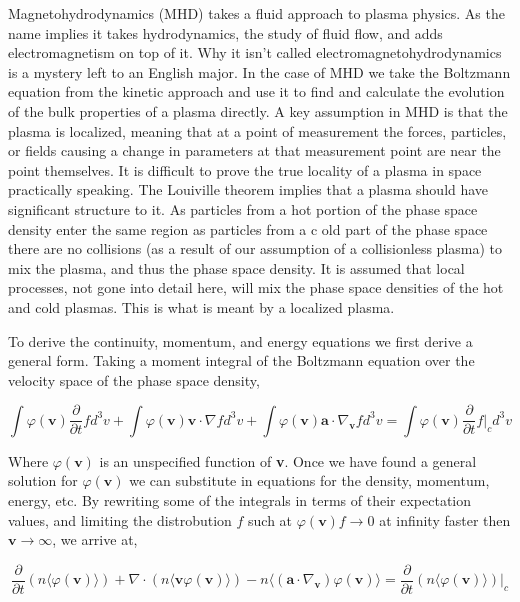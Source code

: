 \documentclass[utf8]{report}
\begin{document}
Magnetohydrodynamics (MHD) takes a fluid approach to plasma physics. As the name implies it takes hydrodynamics, the study of fluid flow, and adds electromagnetism on top of it. Why it isn't called electromagnetohydrodynamics is a mystery left to an English major. In the case of MHD we take the Boltzmann equation from the kinetic approach and use it to find and calculate the evolution of the bulk properties of a plasma directly. A key assumption in MHD is that the plasma is localized, meaning that at a point of measurement the forces, particles, or fields causing a change in parameters at that measurement point are near the point themselves. It is difficult to prove the true locality of a plasma in space practically speaking. The Louiville theorem implies that a plasma should have significant structure to it. As particles from a hot portion of the phase space density enter the same region as particles from a c old part of the phase space there are no collisions (as a result of our assumption of a collisionless plasma) to mix the plasma, and thus the phase space density. It is assumed that local processes, not gone into detail here, will mix the phase space densities of the hot and cold plasmas. This is what is meant by a localized plasma. 

To derive the continuity, momentum, and energy equations we first derive a general form. Taking a moment integral of the Boltzmann equation over the velocity space of the phase space density, 

\begin{equation}
    \int \varphi(\textbf{v}) \frac{\partial}{\partial t} f d^{3}v + \int \varphi(\textbf{v})\textbf{v} \cdot \nabla f d^{3}v + \int \varphi(\textbf{v})\textbf{a} \cdot \nabla_{\textbf{v}} f d^{3}v 
    = \int \varphi(\textbf{v})\frac{\partial}{\partial t}f |_{c} d^{3}v 
    \label{eq:MHD.1}
\end{equation}

Where $\varphi(\textbf{v})$ is an unspecified function of \textbf{v}. Once we have found a general solution for $\varphi(\textbf{v})$ we can substitute in equations for the density, momentum, energy, etc. By rewriting some of the integrals in terms of their expectation values, and limiting the distrobution $f$ such at  $\varphi(\textbf{v})f \rightarrow 0$ at infinity faster then $\textbf{v} \rightarrow \infty$, we arrive at, 

\begin{equation}
    \frac{\partial}{\partial t} (n\langle\varphi(\textbf{v})\rangle) + \nabla \cdot (n\langle\textbf{v}\varphi(\textbf{v})\rangle) - n\langle(\textbf{a}\cdot\nabla_{\textbf{v}})\varphi(\textbf{v})\rangle = \frac{\partial}{\partial t} (n\langle\varphi(\textbf{v})\rangle)|_{c}
    \label{eq:MHD.2}
\end{equation}
\end{document}
